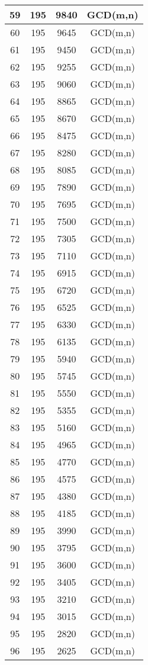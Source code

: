 \documentclass[a4paper,10pt]{article}
\begin{document}
\begin{longtable}{c|c|c|c}
59&195&9840&GCD(m,n)\\\hline
60&195&9645&GCD(m,n)\\\hline
61&195&9450&GCD(m,n)\\\hline
62&195&9255&GCD(m,n)\\\hline
63&195&9060&GCD(m,n)\\\hline
64&195&8865&GCD(m,n)\\\hline
65&195&8670&GCD(m,n)\\\hline
66&195&8475&GCD(m,n)\\\hline
67&195&8280&GCD(m,n)\\\hline
68&195&8085&GCD(m,n)\\\hline
69&195&7890&GCD(m,n)\\\hline
70&195&7695&GCD(m,n)\\\hline
71&195&7500&GCD(m,n)\\\hline
72&195&7305&GCD(m,n)\\\hline
73&195&7110&GCD(m,n)\\\hline
74&195&6915&GCD(m,n)\\\hline
75&195&6720&GCD(m,n)\\\hline
76&195&6525&GCD(m,n)\\\hline
77&195&6330&GCD(m,n)\\\hline
78&195&6135&GCD(m,n)\\\hline
79&195&5940&GCD(m,n)\\\hline
80&195&5745&GCD(m,n)\\\hline
81&195&5550&GCD(m,n)\\\hline
82&195&5355&GCD(m,n)\\\hline
83&195&5160&GCD(m,n)\\\hline
84&195&4965&GCD(m,n)\\\hline
85&195&4770&GCD(m,n)\\\hline
86&195&4575&GCD(m,n)\\\hline
87&195&4380&GCD(m,n)\\\hline
88&195&4185&GCD(m,n)\\\hline
89&195&3990&GCD(m,n)\\\hline
90&195&3795&GCD(m,n)\\\hline
91&195&3600&GCD(m,n)\\\hline
92&195&3405&GCD(m,n)\\\hline
93&195&3210&GCD(m,n)\\\hline
94&195&3015&GCD(m,n)\\\hline
95&195&2820&GCD(m,n)\\\hline
96&195&2625&GCD(m,n)\\\hline

\end{longtable}
\end{document}
